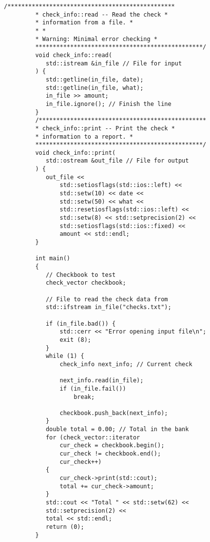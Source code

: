 \begin{LTR}
\begin{lstlisting}[style=C++Style]
         /************************************************
         * check_info::read -- Read the check *
         * information from a file. *
         * *
         * Warning: Minimal error checking *
         ************************************************/
         void check_info::read(
         	std::istream &in_file // File for input
         ) {
         	std::getline(in_file, date);
         	std::getline(in_file, what);
         	in_file >> amount;
         	in_file.ignore(); // Finish the line
         }
         /************************************************
         * check_info::print -- Print the check *
         * information to a report. *
         ************************************************/
         void check_info::print(
         	std::ostream &out_file // File for output
         ) {
         	out_file <<
         		std::setiosflags(std::ios::left) <<
        		std::setw(10) << date <<
         		std::setw(50) << what <<
         		std::resetiosflags(std::ios::left) <<
         		std::setw(8) << std::setprecision(2) <<
         		std::setiosflags(std::ios::fixed) <<
         		amount << std::endl;
         }

         int main()
         {
         	// Checkbook to test
         	check_vector checkbook;

         	// File to read the check data from
         	std::ifstream in_file("checks.txt");

         	if (in_file.bad()) {
         		std::cerr << "Error opening input file\n";
         		exit (8);
         	}
         	while (1) {
         		check_info next_info; // Current check

         		next_info.read(in_file);
         		if (in_file.fail())
         			break;

         		checkbook.push_back(next_info);
         	}
         	double total = 0.00; // Total in the bank
         	for (check_vector::iterator
         		cur_check = checkbook.begin();
         		cur_check != checkbook.end();
         		cur_check++)
         	{
         		cur_check->print(std::cout);
         		total += cur_check->amount;
         	}
         	std::cout << "Total " << std::setw(62) <<
         	std::setprecision(2) <<
         	total << std::endl;
         	return (0);
         }
    \end{lstlisting}
\end{LTR}